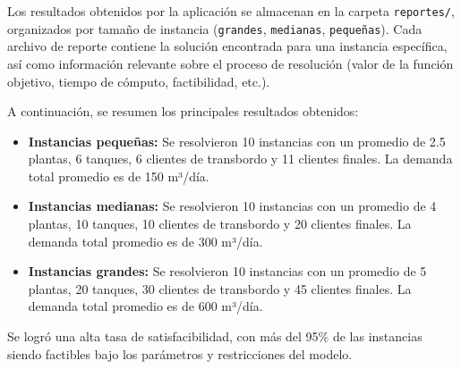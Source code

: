 \documentclass[12pt]{article}
\begin{document}
Los resultados obtenidos por la aplicación se almacenan en la carpeta \texttt{reportes/}, organizados por tamaño de instancia (\texttt{grandes}, \texttt{medianas}, \texttt{pequeñas}). Cada archivo de reporte contiene la solución encontrada para una instancia específica, así como información relevante sobre el proceso de resolución (valor de la función objetivo, tiempo de cómputo, factibilidad, etc.).

A continuación, se resumen los principales resultados obtenidos:

\begin{itemize}
    \item \textbf{Instancias pequeñas:} Se resolvieron 10 instancias con un promedio de 2.5 plantas, 6 tanques, 6 clientes de transbordo y 11 clientes finales. La demanda total promedio es de 150 m³/día.
    \item \textbf{Instancias medianas:} Se resolvieron 10 instancias con un promedio de 4 plantas, 10 tanques, 10 clientes de transbordo y 20 clientes finales. La demanda total promedio es de 300 m³/día.
    \item \textbf{Instancias grandes:} Se resolvieron 10 instancias con un promedio de 5 plantas, 20 tanques, 30 clientes de transbordo y 45 clientes finales. La demanda total promedio es de 600 m³/día.
\end{itemize}

Se logró una alta tasa de satisfacibilidad, con más del 95\% de las instancias siendo factibles bajo los parámetros y restricciones del modelo.
\end{document}
